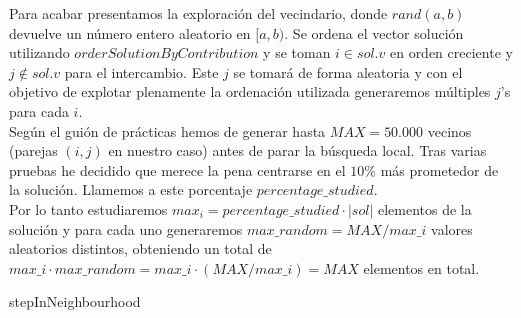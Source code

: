 \documentclass[11pt,a4paper]{article}
\begin{document}
	Para acabar presentamos la exploración del vecindario, donde $rand(a,b)$ devuelve un número entero aleatorio en $[a,b)$. Se ordena el vector solución utilizando $orderSolutionByContribution$ y se toman $i \in sol.v$ en orden creciente y $j \notin sol.v$ para el intercambio. Este $j$ se tomará de forma aleatoria y con el objetivo de explotar plenamente la ordenación utilizada generaremos múltiples $j$'s para cada $i$. \\
	
	Según el guión de prácticas hemos de generar hasta $MAX = 50.000$ vecinos (parejas $(i,j)$ en nuestro caso) antes de parar la búsqueda local. Tras varias pruebas he decidido que merece la pena centrarse en el $10\%$ más prometedor de la solución. Llamemos a este porcentaje $percentage\_studied$. \\
	
	Por lo tanto estudiaremos $max_i = percentage\_studied \cdot |sol|$ elementos de la solución y para cada uno generaremos $max\_random = MAX / max\_i$ valores aleatorios distintos, obteniendo un total de $ max\_i \cdot max\_random = max\_i \cdot (MAX / max\_i) = MAX$ elementos en total. \\

	\begin{algorithm}[H]
		\caption{stepInNeighbourhood}
	\end{algorithm}
\end{document}
